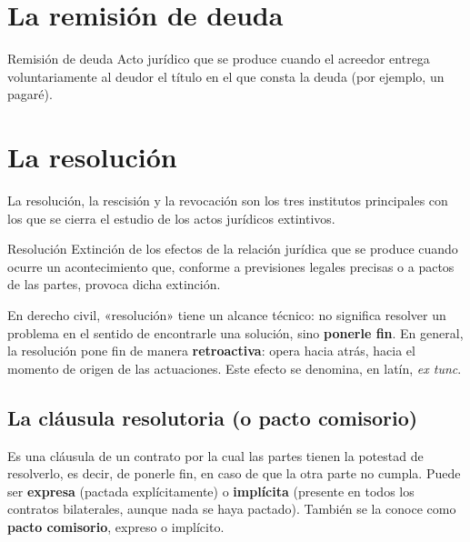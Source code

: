 \documentclass[12pt,oneside]{book}
\begin{document}
\section{La remisión de deuda}

\begin{definition}{Remisión de deuda}
Acto jurídico que se produce cuando el acreedor entrega voluntariamente al deudor el título en el que consta la deuda (por ejemplo, un pagaré).
\end{definition}

\section{La resolución}

La resolución, la rescisión y la revocación son los tres institutos principales con los que se cierra el estudio de los actos jurídicos extintivos.

\begin{definition}{Resolución}
Extinción de los efectos de la relación jurídica que se produce cuando ocurre un acontecimiento que, conforme a previsiones legales precisas o a pactos de las partes, provoca dicha extinción.
\end{definition}

\begin{important}
En derecho civil, «resolución» tiene un alcance técnico: no significa resolver un problema en el sentido de encontrarle una solución, sino \textbf{ponerle fin}. En general, la resolución pone fin de manera \textbf{retroactiva}: opera hacia atrás, hacia el momento de origen de las actuaciones. Este efecto se denomina, en latín, \textit{ex tunc}.
\end{important}

\subsection{La cláusula resolutoria (o pacto comisorio)}

Es una cláusula de un contrato por la cual las partes tienen la potestad de resolverlo, es decir, de ponerle fin, en caso de que la otra parte no cumpla. Puede ser \textbf{expresa} (pactada explícitamente) o \textbf{implícita} (presente en todos los contratos bilaterales, aunque nada se haya pactado). También se la conoce como \textbf{pacto comisorio}, expreso o implícito.
\end{document}
